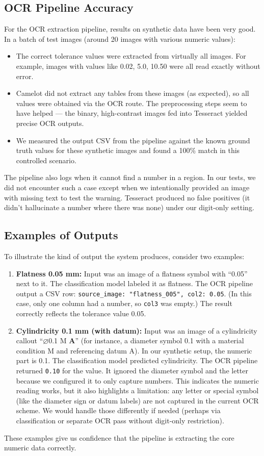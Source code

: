\documentclass[11pt,a4paper]{article}
\begin{document}
\subsection*{OCR Pipeline Accuracy}
For the OCR extraction pipeline, results on synthetic data have been very good. In a batch of test images (around 20 images with various numeric values):
\begin{itemize}
  \item The correct tolerance values were extracted from virtually all images. For example, images with values like 0.02, 5.0, 10.50 were all read exactly without error.
  \item Camelot did not extract any tables from these images (as expected), so all values were obtained via the OCR route. The preprocessing steps seem to have helped — the binary, high-contrast images fed into Tesseract yielded precise OCR outputs.
  \item We measured the output CSV from the pipeline against the known ground truth values for these synthetic images and found a 100\% match in this controlled scenario.
\end{itemize}
The pipeline also logs when it cannot find a number in a region. In our tests, we did not encounter such a case except when we intentionally provided an image with missing text to test the warning. Tesseract produced no false positives (it didn’t hallucinate a number where there was none) under our digit-only setting.

\subsection*{Examples of Outputs}
To illustrate the kind of output the system produces, consider two examples:
\begin{enumerate}
  \item \textbf{Flatness 0.05 mm:} Input was an image of a flatness symbol with “0.05” next to it. The classification model labeled it as flatness. The OCR pipeline output a CSV row: \verb|source_image: "flatness_005", col2: 0.05|. (In this case, only one column had a number, so \verb|col3| was empty.) The result correctly reflects the tolerance value 0.05.
  \item \textbf{Cylindricity 0.1 mm (with datum):} Input was an image of a cylindricity callout “⌀0.1 M \textbf{A}” (for instance, a diameter symbol 0.1 with a material condition M and referencing datum A). In our synthetic setup, the numeric part is 0.1. The classification model predicted cylindricity. The OCR pipeline returned \verb|0.10| for the value. It ignored the diameter symbol and the letter because we configured it to only capture numbers. This indicates the numeric reading works, but it also highlights a limitation: any letter or special symbol (like the diameter sign or datum labels) are not captured in the current OCR scheme. We would handle those differently if needed (perhaps via classification or separate OCR pass without digit-only restriction).
\end{enumerate}
These examples give us confidence that the pipeline is extracting the core numeric data correctly.
\end{document}
